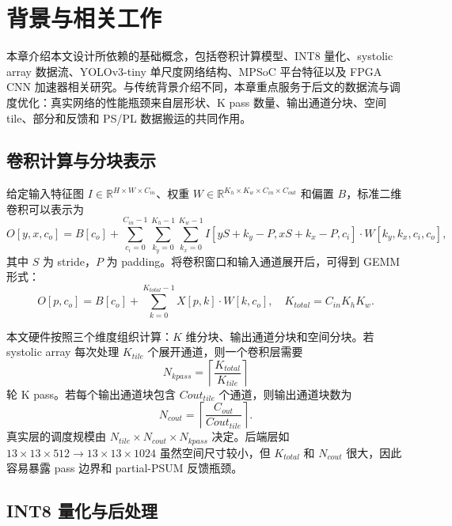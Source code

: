\chapter{背景与相关工作}
\label{chap:related}

本章介绍本文设计所依赖的基础概念，包括卷积计算模型、INT8 量化、systolic array 数据流、YOLOv3-tiny 单尺度网络结构、MPSoC 平台特征以及 FPGA CNN 加速器相关研究。与传统背景介绍不同，本章重点服务于后文的数据流与调度优化：真实网络的性能瓶颈来自层形状、K pass 数量、输出通道分块、空间 tile、部分和反馈和 PS/PL 数据搬运的共同作用。

\section{卷积计算与分块表示}

给定输入特征图 $I \in \mathbb{R}^{H \times W \times C_{in}}$、权重 $W \in \mathbb{R}^{K_h \times K_w \times C_{in} \times C_{out}}$ 和偏置 $B$，标准二维卷积可以表示为
\begin{equation}
O[y,x,c_o] = B[c_o] + \sum_{c_i=0}^{C_{in}-1} \sum_{k_y=0}^{K_h-1} \sum_{k_x=0}^{K_w-1}
I[yS+k_y-P, xS+k_x-P, c_i] \cdot W[k_y,k_x,c_i,c_o],
\label{eq:conv2d}
\end{equation}
其中 $S$ 为 stride，$P$ 为 padding。将卷积窗口和输入通道展开后，可得到 GEMM 形式：
\begin{equation}
O[p,c_o] = B[c_o] + \sum_{k=0}^{K_{total}-1} X[p,k] \cdot W[k,c_o],
\quad K_{total}=C_{in}K_hK_w .
\label{eq:gemm}
\end{equation}

本文硬件按照三个维度组织计算：$K$ 维分块、输出通道分块和空间分块。若 systolic array 每次处理 $K_{tile}$ 个展开通道，则一个卷积层需要
\begin{equation}
N_{kpass}=\left\lceil \frac{K_{total}}{K_{tile}} \right\rceil
\end{equation}
轮 K pass。若每个输出通道块包含 $Cout_{tile}$ 个通道，则输出通道块数为
\begin{equation}
N_{cout}=\left\lceil \frac{C_{out}}{Cout_{tile}} \right\rceil .
\end{equation}
真实层的调度规模由 $N_{tile}\times N_{cout}\times N_{kpass}$ 决定。后端层如 $13\times13\times512 \rightarrow 13\times13\times1024$ 虽然空间尺寸较小，但 $K_{total}$ 和 $N_{cout}$ 很大，因此容易暴露 pass 边界和 partial-PSUM 反馈瓶颈。

\section{INT8 量化与后处理}


